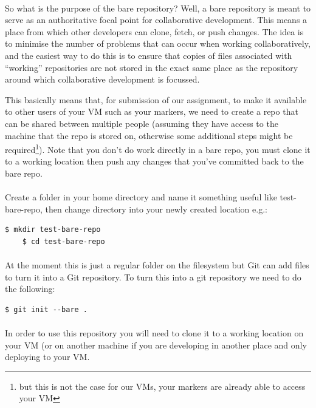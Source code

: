 \documentclass[12pt, a4paper, oneside]{book}
\begin{document}
\paragraph{} So what is the purpose of the bare repository? Well, a bare repository is meant to serve as an authoritative focal point for collaborative development. This means a place from which other developers can clone, fetch, or push changes. The idea is to minimise the number of problems that can occur when working collaboratively, and the easiest way to do this is to ensure that copies of files associated with ``working'' repositories are not stored in the exact same place as the repository around which collaborative development is focussed.

This basically means that, for submission of our assignment, to make it available to other users of your VM such as your markers, we need to create a repo that can be shared between multiple people (assuming they have access to the machine that the repo is stored on, otherwise some additional steps might be required\footnote{but this is not the case for our VMs, your markers are already able to access your VM}). Note that you don't do work directly in a bare repo, you must clone it to a working location then push any changes that you've committed back to the bare repo.

\paragraph{} Create a folder in your home directory and name it something useful like test-bare-repo, then change directory into your newly created location e.g.:

\begin{lstlisting}[style=DOS]
    $ mkdir test-bare-repo
    $ cd test-bare-repo
\end{lstlisting}

\paragraph{} At the moment this is just a regular folder on the filesystem but Git can add files to turn it into a Git repository. To turn this into a git repository we need to do the following: 

\begin{lstlisting}[style=DOS]
    $ git init --bare .
\end{lstlisting}

\paragraph{} In order to use this repository you will need to clone it to a working location on your VM (or on another machine if you are developing in another place and only deploying to your VM.
\end{document}
